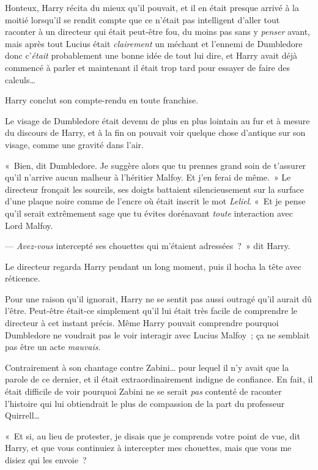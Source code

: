 Honteux, Harry récita du mieux qu'il pouvait, et il en était presque arrivé à la moitié lorsqu'il se rendit compte que ce n'était pas intelligent d'aller tout raconter à un directeur qui était peut-être fou, du moins pas sans y \emph{penser} avant, mais après tout Lucius était \emph{clairement} un méchant et l'ennemi de Dumbledore donc c'\emph{était} probablement une bonne idée de tout lui dire, et Harry avait déjà commencé à parler et maintenant il était trop tard pour essayer de faire des calculs…

Harry conclut son compte-rendu en toute franchise.

Le visage de Dumbledore était devenu de plus en plus lointain au fur et à mesure du discours de Harry, et à la fin on pouvait voir quelque chose d'antique sur son visage, comme une gravité dans l'air.

«~Bien, dit Dumbledore.
Je suggère alors que tu prennes grand soin de t'assurer qu'il n'arrive aucun malheur à l'héritier Malfoy.
Et j'en ferai de même.~»
Le directeur fronçait les sourcils, ses doigts battaient silencieusement sur la surface d'une plaque noire comme de l'encre où était inscrit le mot \emph{Leliel}.
«~Et je pense qu'il serait extrêmement sage que tu évites dorénavant \emph{toute} interaction avec Lord Malfoy.

--- \emph{Avez-vous} intercepté ses chouettes qui m'étaient adressées~?~»
dit Harry.

Le directeur regarda Harry pendant un long moment, puis il hocha la tête avec réticence.

Pour une raison qu'il ignorait, Harry ne se sentit pas aussi outragé qu'il aurait dû l'être.
Peut-être était-ce simplement qu'il lui était très facile de comprendre le directeur à cet instant précis.
Même Harry pouvait comprendre pourquoi Dumbledore ne voudrait pas le voir interagir avec Lucius Malfoy~; ça ne semblait pas être un acte \emph{mauvais}.

Contrairement à son chantage contre Zabini… pour lequel il n'y avait que la parole de ce dernier, et il était extraordinairement indigne de confiance.
En fait, il était difficile de voir pourquoi Zabini ne se serait \emph{pas} contenté de raconter l'histoire qui lui obtiendrait le plus de compassion de la part du professeur Quirrell…

«~Et si, au lieu de protester, je disais que je comprends votre point de vue, dit Harry, et que vous continuiez à intercepter mes chouettes, mais que vous me disiez qui les envoie~?


